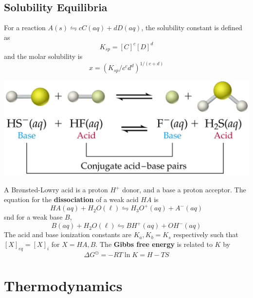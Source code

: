 \documentclass{tufte-book}
\renewcommand{\emph}[1]{\textbf{#1}}
\begin{document}
\section{Solubility Equilibria}
For a reaction $A(s) \leftrightharpoons cC(aq) + dD(aq)$, the solubility constant is defined as \begin{equation}
  K_{sp} = [C]^c [D]^d
\end{equation}
and the molar solubility is \begin{equation}
  x = (K_{sp}/c^cd^d)^{1/(c+d)}
\end{equation}
%
\begin{marginfigure}[5mm]
\begin{center}
  \includegraphics[width=\textwidth]{acidbase}
\end{center}
\end{marginfigure}
%
A Brønsted-Lowry acid is a proton $H^+$ donor, and a base a proton acceptor. The equation for the \emph{dissociation} of a weak acid $HA$ is \begin{equation}
  HA(aq) + H_2O (\ell) \leftrightharpoons H_3O^+ (aq) + A^- (aq)
\end{equation}
snd for a weak base $B$,
\begin{equation}
  B(aq) + H_2O (\ell) \leftrightharpoons BH^+ (aq) + OH^-(aq)
\end{equation}
The acid and base ionization constants are $K_a,K_b = K_s$ respectively such that $[X]_{eq} = [X]_i$ for $X = HA, B$. The \emph{Gibbs free energy} is related to $K$ by \begin{equation}
\Delta G^\ominus = -RT \ln K = H-TS
\end{equation}

\chapter{Thermodynamics}
\end{document}
